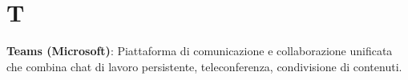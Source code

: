 \section{T}
\textbf{Teams (Microsoft)}: Piattaforma di comunicazione e collaborazione unificata che combina chat di lavoro persistente, teleconferenza, condivisione di contenuti.\\